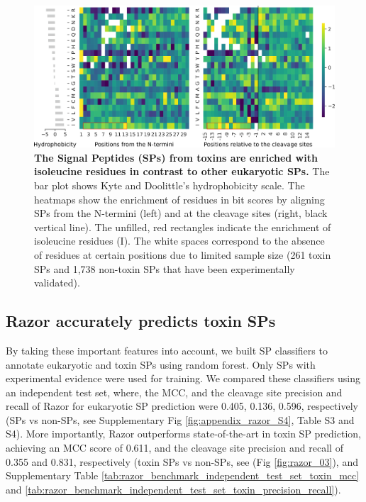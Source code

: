 \begin{figure}[!hbtp]
\centerline{\includegraphics[width=1\textwidth]{chapters/Signal_Peptide/Figures/fig1_bitscore_heatmap_toxin.png}}
\caption[The Signal Peptides (SPs) from toxins are enriched with isoleucine residues in contrast to other eukaryotic SPs.]{\textbf{The Signal Peptides (SPs) from toxins are enriched with isoleucine residues in contrast to other eukaryotic SPs.} The bar plot shows Kyte and Doolittle’s hydrophobicity scale. The heatmaps show the enrichment of residues in bit scores by aligning SPs from the N-termini (left) and at the cleavage sites (right, black vertical line). The unfilled, red rectangles indicate the enrichment of isoleucine residues (I). The white spaces correspond to the absence of residues at certain positions due to limited sample size (261 toxin SPs and 1,738 non-toxin SPs that have been experimentally validated).
}\label{fig:razor_02}
\end{figure}



\subsection{Razor accurately predicts toxin SPs}
By taking these important features into account, we built SP classifiers to annotate eukaryotic and toxin SPs using random forest. Only SPs with experimental evidence were used for training. We compared these classifiers using an independent test set, where, the MCC, and the cleavage site precision and recall of Razor for eukaryotic SP prediction were 0.405, 0.136, 0.596, respectively (SPs vs non-SPs, see Supplementary Fig \ref{fig:appendix_razor_S4}, Table S3 and S4). More importantly, Razor outperforms state-of-the-art in toxin SP prediction, achieving an MCC score of 0.611, and the cleavage site precision and recall of 0.355 and 0.831, respectively (toxin SPs vs non-SPs, see (Fig \ref{fig:razor_03}), and Supplementary Table \ref{tab:razor_benchmark_independent_test_set_toxin_mcc} and \ref{tab:razor_benchmark_independent_test_set_toxin_precision_recall}).


